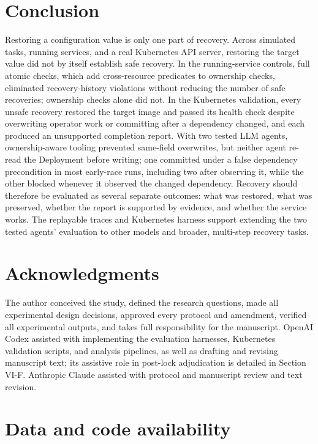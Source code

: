 \documentclass[conference,10pt]{IEEEtran}
\begin{document}
\section{Conclusion}

Restoring a configuration value is only one part of recovery. Across simulated tasks, running services, and a real Kubernetes API server, restoring the target value did not by itself establish safe recovery. In the running\hyp{}service controls, full atomic checks, which add cross\hyp{}resource predicates to ownership checks, eliminated recovery\hyp{}history violations without reducing the number of safe recoveries; ownership checks alone did not. In the Kubernetes validation, every unsafe recovery restored the target image and passed its health check despite overwriting operator work or committing after a dependency changed, and each produced an unsupported completion report. With two tested LLM agents, ownership\hyp{}aware tooling prevented same\hyp{}field overwrites, but neither agent re\hyp{}read the Deployment before writing; one committed under a false dependency precondition in most early\hyp{}race runs, including two after observing it, while the other blocked whenever it observed the changed dependency. Recovery should therefore be evaluated as several separate outcomes: what was restored, what was preserved, whether the report is supported by evidence, and whether the service works. The replayable traces and Kubernetes harness support extending the two tested agents' evaluation to other models and broader, multi\hyp{}step recovery tasks.

\section*{Acknowledgments}

The author conceived the study, defined the research questions, made all experimental design decisions, approved every protocol and amendment, verified all experimental outputs, and takes full responsibility for the manuscript. OpenAI Codex assisted with implementing the evaluation harnesses, Kubernetes validation scripts, and analysis pipelines, as well as drafting and revising manuscript text; its assistive role in post\hyp{}lock adjudication is detailed in Section VI\hyp{}F. Anthropic Claude assisted with protocol and manuscript review and text revision.

\section*{Data and code availability}
\end{document}
